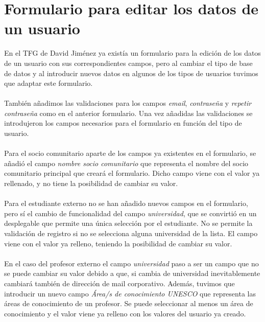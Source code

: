 \documentclass[11pt]{book}
\begin{document}
\section{Formulario para editar los datos de un usuario}
En el TFG de David Jiménez ya existía un formulario para la edición de los datos de un usuario con sus correspondientes campos, pero al cambiar el tipo de base de datos y al introducir nuevos datos en algunos de los tipos de usuarios tuvimos que adaptar este formulario. \\\\
También añadimos las validaciones para los campos \emph{email}, \emph{contraseña} y \emph{repetir contraseña} como en el anterior formulario. Una vez añadidas las validaciones se introdujeron los campos necesarios para el formulario en función del tipo de usuario.\\\\
Para el socio comunitario aparte de los campos ya existentes en el formulario, se añadió el campo \emph{nombre socio comunitario} que representa el nombre del socio comunitario principal que creará el formulario. Dicho campo viene con el valor ya rellenado, y no tiene la posibilidad de cambiar su valor.\\\\
Para el estudiante externo no se han añadido nuevos campos en el formulario, pero sí el cambio de funcionalidad del campo \emph{universidad}, que se convirtió en un desplegable que permite una única selección por el estudiante.  No se permite la validación de registro si no se selecciona alguna universidad de la lista. El campo viene con el valor ya relleno, teniendo la posibilidad de cambiar su valor.\\\\
En el caso del profesor externo el campo \emph{universidad} paso a ser un campo que no se puede cambiar su valor debido a que, si cambia de universidad inevitablemente cambiará también de dirección de mail corporativo. Además, tuvimos que introducir un nuevo campo \emph{Área/s de conocimiento UNESCO} que representa las áreas de conocimiento de un profesor. Se puede seleccionar al menos un área de conocimiento y el valor viene ya relleno con los valores del usuario ya creado.
\end{document}
